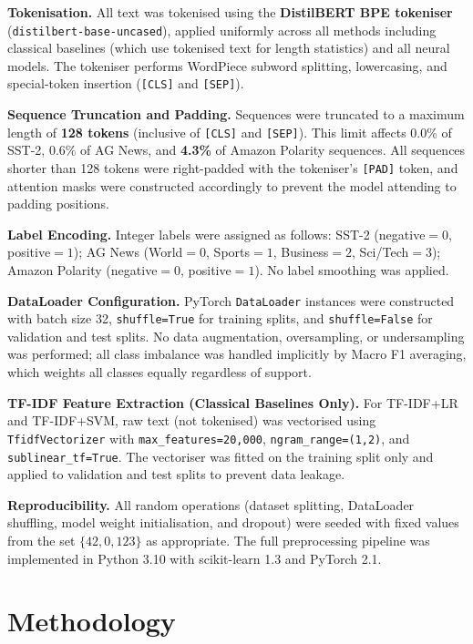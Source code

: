 \documentclass[conference]{IEEEtran}
\begin{document}
\textbf{Tokenisation.} All text was tokenised using the \textbf{DistilBERT BPE tokeniser} (\texttt{distilbert-base-uncased}), applied uniformly across all methods including classical baselines (which use tokenised text for length statistics) and all neural models. The tokeniser performs WordPiece subword splitting, lowercasing, and special-token insertion (\texttt{[CLS]} and \texttt{[SEP]}).

\textbf{Sequence Truncation and Padding.} Sequences were truncated to a maximum length of \textbf{128 tokens} (inclusive of \texttt{[CLS]} and \texttt{[SEP]}). This limit affects 0.0\% of SST-2, 0.6\% of AG News, and \textbf{4.3\%} of Amazon Polarity sequences. All sequences shorter than 128 tokens were right-padded with the tokeniser's \texttt{[PAD]} token, and attention masks were constructed accordingly to prevent the model attending to padding positions.

\textbf{Label Encoding.} Integer labels were assigned as follows: SST-2 (negative$=0$, positive$=1$); AG News (World$=0$, Sports$=1$, Business$=2$, Sci/Tech$=3$); Amazon Polarity (negative$=0$, positive$=1$). No label smoothing was applied.

\textbf{DataLoader Configuration.} PyTorch \texttt{DataLoader} instances were constructed with batch size 32, \texttt{shuffle=True} for training splits, and \texttt{shuffle=False} for validation and test splits. No data augmentation, oversampling, or undersampling was performed; all class imbalance was handled implicitly by Macro F1 averaging, which weights all classes equally regardless of support.

\textbf{TF-IDF Feature Extraction (Classical Baselines Only).} For TF-IDF+LR and TF-IDF+SVM, raw text (not tokenised) was vectorised using \texttt{TfidfVectorizer} with \texttt{max\_features=20{,}000}, \texttt{ngram\_range=(1,2)}, and \texttt{sublinear\_tf=True}. The vectoriser was fitted on the training split only and applied to validation and test splits to prevent data leakage.

\textbf{Reproducibility.} All random operations (dataset splitting, DataLoader shuffling, model weight initialisation, and dropout) were seeded with fixed values from the set $\{42, 0, 123\}$ as appropriate. The full preprocessing pipeline was implemented in Python 3.10 with scikit-learn 1.3 and PyTorch 2.1.

\section{Methodology}
\label{sec:methodology}
\end{document}
